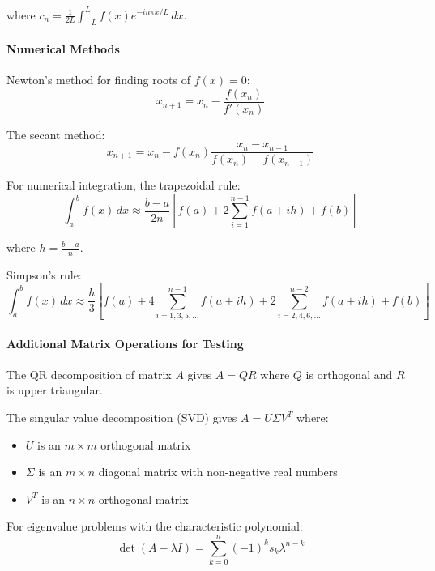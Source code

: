 \documentclass[12pt]{article}
\begin{document}
where $c_n = \frac{1}{2L} \int_{-L}^{L} f(x) e^{-in\pi x/L} \, dx$.

\paragraph{Numerical Methods}

Newton's method for finding roots of $f(x) = 0$:
\begin{equation}
x_{n+1} = x_n - \frac{f(x_n)}{f'(x_n)}
\end{equation}

The secant method:
\begin{equation}
x_{n+1} = x_n - f(x_n) \frac{x_n - x_{n-1}}{f(x_n) - f(x_{n-1})}
\end{equation}

For numerical integration, the trapezoidal rule:
\begin{equation}
\int_a^b f(x) \, dx \approx \frac{b-a}{2n} \left[f(a) + 2\sum_{i=1}^{n-1} f(a + ih) + f(b)\right]
\end{equation}

where $h = \frac{b-a}{n}$.

Simpson's rule:
\begin{equation}
\int_a^b f(x) \, dx \approx \frac{h}{3} \left[f(a) + 4\sum_{i=1,3,5,...}^{n-1} f(a + ih) + 2\sum_{i=2,4,6,...}^{n-2} f(a + ih) + f(b)\right]
\end{equation}

\paragraph{Additional Matrix Operations for Testing}

The QR decomposition of matrix $A$ gives $A = QR$ where $Q$ is orthogonal and $R$ is upper triangular.

The singular value decomposition (SVD) gives $A = U\Sigma V^T$ where:
\begin{itemize}
\item $U$ is an $m \times m$ orthogonal matrix
\item $\Sigma$ is an $m \times n$ diagonal matrix with non-negative real numbers
\item $V^T$ is an $n \times n$ orthogonal matrix
\end{itemize}

For eigenvalue problems with the characteristic polynomial:
\begin{equation}
\det(A - \lambda I) = \sum_{k=0}^{n} (-1)^k s_k \lambda^{n-k}
\end{equation}
\end{document}
